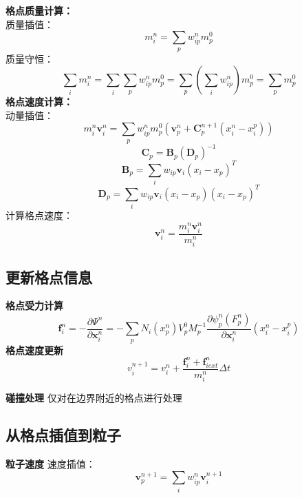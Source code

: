 \documentclass[14pt]{scrartcl} %
\begin{document}
\textbf{格点质量计算：}\\
质量插值：
\begin{equation}
m_i^n=\sum\limits_p w_{ip}^nm_p^0
\end{equation}
质量守恒：
\begin{equation}
\sum\limits_i m_i^n=\sum\limits_i\sum\limits_p w_{ip}^nm_p^0=\sum\limits_p\left(\sum\limits_i w_{ip}^n\right)m_p^0=\sum\limits_p m_p^0
\end{equation}
\textbf{格点速度计算：}\\
动量插值：
\begin{equation}
m_i^n \boldsymbol v_i^n=\sum\limits_p w_{ip}^nm_p^0(\boldsymbol v_p^n+\boldsymbol C_p^{n+1}(x_i^n-x_i^p))
\end{equation}
\begin{equation}
\boldsymbol C_p=\boldsymbol B_p(\boldsymbol D_p)^{-1}
\end{equation}
\begin{equation}
\boldsymbol B_p=\sum\limits_iw_{ip}\boldsymbol v_i(x_i-x_p)^T
\end{equation}
\begin{equation}
\boldsymbol D_p=\sum\limits_i w_{ip}\boldsymbol v_i(x_i-x_p)(x_i-x_p)^T
\end{equation}
计算格点速度：
\begin{equation}
\boldsymbol v_i^n=\frac{m_i^n\boldsymbol v_i^n}{m_i^n}
\end{equation}
\pagebreak
\subsection{更新格点信息}
\textbf{格点受力计算}
\begin{equation}
\boldsymbol f_i^n=-\frac{\partial \Psi^n}{\partial \boldsymbol x_i^n}=-\sum\limits_p N_i(x_p^n)V_p^0M_p^{-1}\frac{\partial \psi_p^n(F_p^n)}{\partial \boldsymbol x_i^n}(x_i^n-x_i^p)
\end{equation}
\textbf{格点速度更新}
\begin{equation}
v_i^{n+1}=v_i^n+\frac{\boldsymbol f_i^n+\boldsymbol f^n_{iext}}{m_i^n}\Delta t
\end{equation}

\textbf{碰撞处理}
仅对在边界附近的格点进行处理

\subsection{从格点插值到粒子}
\textbf{粒子速度}
速度插值：
\begin{equation}
\boldsymbol v_p^{n+1}=\sum\limits_iw_{ip}^n\boldsymbol v_i^{n+1}
\end{equation}
\end{document}
